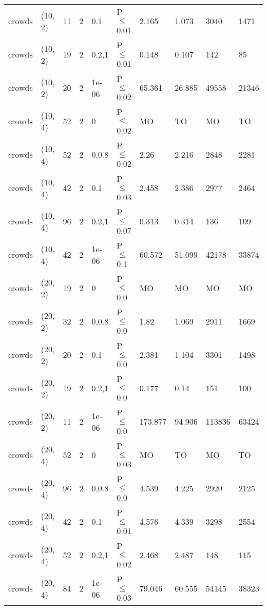 \begin{longtable}{llrrllllll}
 crowds        & (10, 2)   &     	11 &   2 & 0.1   & P$\leq$0.01  & 2.165    & 1.073    & 3040    & 1471    \\
 crowds        & (10, 2)   &     	19 &   2 & 0.2,1 & P$\leq$0.01  & 0.148    & 0.107    & 142     & 85      \\
 crowds        & (10, 2)   &     	20 &   2 & 1e-06 & P$\leq$0.02  & 65.361   & 26.885   & 49558   & 21346   \\
 crowds        & (10, 4)   &     	52 &   2 & 0     & P$\leq$0.02  & MO       & TO       & MO      & TO      \\
 crowds        & (10, 4)   &     	52 &   2 & 0,0.8 & P$\leq$0.02  & 2.26     & 2.216    & 2848    & 2281    \\
 crowds        & (10, 4)   &     	42 &   2 & 0.1   & P$\leq$0.03  & 2.458    & 2.386    & 2977    & 2464    \\
 crowds        & (10, 4)   &     	96 &   2 & 0.2,1 & P$\leq$0.07  & 0.313    & 0.314    & 136     & 109     \\
 crowds        & (10, 4)   &     	42 &   2 & 1e-06 & P$\leq$0.1   & 60.572   & 51.099   & 42178   & 33874   \\
 crowds        & (20, 2)   &     	19 &   2 & 0     & P$\leq$0.0   & MO       & MO       & MO      & MO      \\
 crowds        & (20, 2)   &     	32 &   2 & 0,0.8 & P$\leq$0.0   & 1.82     & 1.069    & 2911    & 1669    \\
 crowds        & (20, 2)   &     	20 &   2 & 0.1   & P$\leq$0.0   & 2.381    & 1.104    & 3301    & 1498    \\
 crowds        & (20, 2)   &     	19 &   2 & 0.2,1 & P$\leq$0.0   & 0.177    & 0.14     & 151     & 100     \\
 crowds        & (20, 2)   &     	11 &   2 & 1e-06 & P$\leq$0.0   & 173.877  & 94.906   & 113836  & 63424   \\
 crowds        & (20, 4)   &     	52 &   2 & 0     & P$\leq$0.03  & MO       & TO       & MO      & TO      \\
 crowds        & (20, 4)   &     	96 &   2 & 0,0.8 & P$\leq$0.0   & 4.539    & 4.225    & 2920    & 2125    \\
 crowds        & (20, 4)   &     	42 &   2 & 0.1   & P$\leq$0.01  & 4.576    & 4.339    & 3298    & 2554    \\
 crowds        & (20, 4)   &     	52 &   2 & 0.2,1 & P$\leq$0.02  & 2.468    & 2.487    & 148     & 115     \\
 crowds        & (20, 4)   &     	84 &   2 & 1e-06 & P$\leq$0.03  & 79.046   & 60.555   & 54145   & 38323   \\

\end{longtable}
